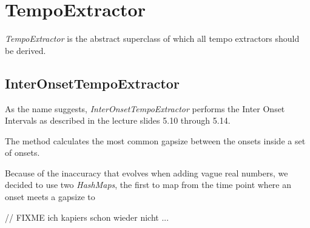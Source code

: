 \section{\ttfamily TempoExtractor}
\emph{TempoExtractor} is the abstract superclass of which all tempo extractors
should be derived.

\subsection{\ttfamily InterOnsetTempoExtractor}
As the name suggests, \emph{InterOnsetTempoExtractor} performs the Inter Onset
Intervals as described in the lecture slides 5.10 through 5.14.

The method calculates the most common gapsize between the onsets inside a set of
onsets. 

Because of the inaccuracy that evolves when adding vague real numbers, we
decided to use two \emph{HashMaps}, the first to map from the time point
where an onset meets a gapsize to 

// FIXME ich kapiers schon wieder nicht ...
